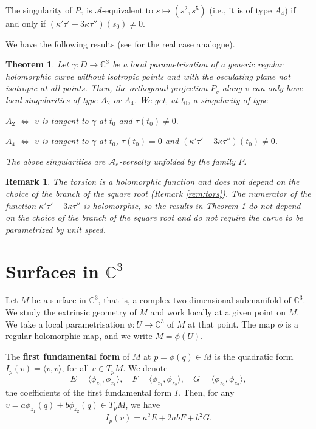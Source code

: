 \documentclass[12pt,a4paper]{article}
\newtheorem{theo}[prop]{Theorem}
\newtheorem{rem}[prop]{Remark}
\begin{document}
The singularity of $P_v$ is ${\mathcal A}$-equivalent to $s\mapsto  (s^2,s^5)$ (i.e., it is of type $A_4$) if and only if $(\kappa'\tau'-3\kappa\tau'')(s_0)\ne 0$.

We have the following results (see \cite{David} for the real case analogue).

\begin{theo}\label{theo:ProjSpCurves}
	Let $\gamma:D\to \mathbb C^3$ be a local parametrisation of a generic regular holomorphic curve without isotropic points and with the 
osculating plane not isotropic at all points.
	Then, the orthogonal projection $P_v$ along $v$ can only have local singularities of type $A_2$ or 
	$A_4$. We get, at $t_0$, a singularity of type 
	
	$A_2$ $\iff$ $v$ is tangent to $\gamma$ at $t_0$ and $\tau(t_0)\ne 0.$
	
	$A_4$ $\iff$ $v$ is tangent to $\gamma$ at $t_0$, $\tau(t_0)=0$ and $(\kappa'\tau'-3\kappa\tau'')(t_0)\ne 0$.
	
	The above singularities are $\mathcal A_e$-versally unfolded by the family $P$.
\end{theo}

\begin{rem}
{\rm 
The torsion is a holomorphic function and does not depend on the choice of the branch of the square root (Remark \ref{rem:tors}). 
The numerator of the function $\kappa'\tau'-3\kappa\tau''$ is holomorphic, so the results in Theorem \ref{theo:ProjSpCurves} do not depend on the choice of the branch of the square root and do not require the curve to be parametrized by unit speed.
}
\end{rem}



\section{Surfaces in $\mathbb{C}^3$} \label{sec:surfaces}

Let $M$ be a surface in $\mathbb C^3$, that is, a complex two-dimensional submanifold of $\mathbb C^3$. We study the extrinsic geometry of $M$ and work locally at a given point on $M$. We take a  
local parametrisation $\phi: U\to \mathbb C^3$ of $M$ at that point. 
The map $\phi$ is a regular holomorphic map, and we write $M=\phi(U)$. 

The {\bf first fundamental form} of $M$ at $p=\phi(q)\in M$ is the quadratic form 
$I_p(v)=\langle v,{v}  \rangle$, for all $v\in T_pM$.
We denote 
$$
E=\langle \phi_{z_1},{\phi_{z_1}} \rangle,\quad
F=\langle\phi_{z_1},{\phi_{z_2}}\rangle,\quad
G=\langle \phi_{z_2},{\phi_{z_2}}\rangle,
$$
the coefficients of the first fundamental form $I$. Then, for any $v=a\phi_{z_1}(q)+b\phi_{z_2}(q)\in T_pM$, we have 
$$
I_p(v)=a^2E+2ab F+b^2G.
$$
\end{document}
